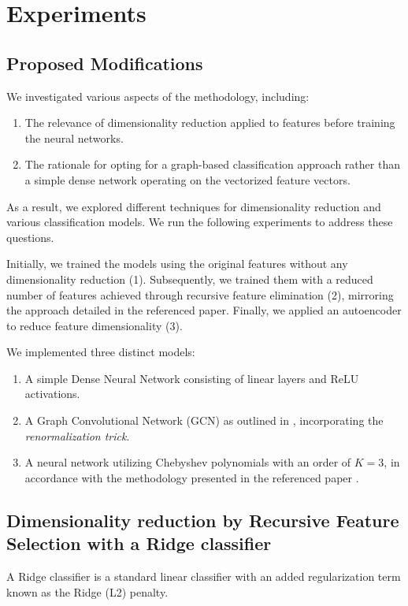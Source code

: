 \section{Experiments}

\subsection{Proposed Modifications}
We investigated various aspects of the methodology, including:
\begin{enumerate}
    \item The relevance of dimensionality reduction applied to features before training the neural networks.
    \item The rationale for opting for a graph-based classification approach rather than a simple dense network operating on the vectorized feature vectors.
\end{enumerate}
As a result, we explored different techniques for dimensionality reduction and various classification models. We run the following experiments to address these questions.

Initially, we trained the models using the original features without any dimensionality reduction (1). Subsequently, we trained them with a reduced number of features achieved through recursive feature elimination (2), mirroring the approach detailed in the referenced paper. Finally, we applied an autoencoder to reduce feature dimensionality (3).

We implemented three distinct models:
\begin{enumerate}
    \item A simple Dense Neural Network consisting of linear layers and ReLU activations.
    \item A Graph Convolutional Network (GCN) as outlined in \cite{kipf_semi-supervised_2017}, incorporating the \textit{renormalization trick}.
    \item A neural network utilizing Chebyshev polynomials with an order of $K=3$, in accordance with the methodology presented in the referenced paper \cite{Parisot17}.
\end{enumerate}


\subsection{Dimensionality reduction by Recursive Feature Selection with a Ridge classifier}

A Ridge classifier is a standard linear classifier with an added regularization term known as the Ridge (L2) penalty.


